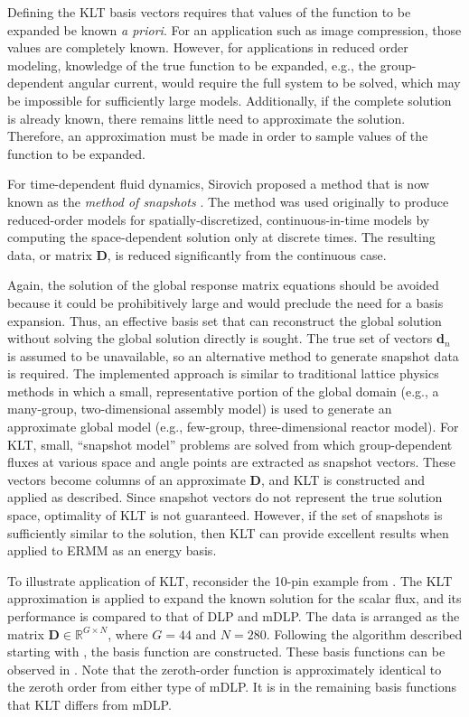 Defining the KLT basis vectors requires that values of the function to be 
expanded be known {\it a priori}.  For an application such as image compression,
those values are completely known.  However, for applications in reduced order 
modeling, knowledge of the true function to be expanded,
e.g., the group-dependent angular current, would require the full system to be 
solved, which may be impossible for sufficiently large models.  Additionally, 
if the complete solution is already known, there remains little need to 
approximate the solution. Therefore, an approximation must be made in order to 
sample values of the function to be expanded.  

For  time-dependent fluid dynamics, Sirovich proposed a method 
\citep{Sirovich1987} that is now known as the {\it method of snapshots} 
\citep{Buchan2013}. The method was used originally to produce reduced-order 
models for spatially-discretized, continuous-in-time models by computing the 
space-dependent solution only at discrete times. The resulting data, or matrix 
$\mathbf{D}$, is reduced significantly from the continuous case.

Again, the solution of the global response matrix equations should 
be avoided because it could be prohibitively large and would preclude the need 
for a basis expansion.  Thus, an effective basis set that can reconstruct 
the global solution without solving the global solution directly is sought.  
The true set of vectors $\mathbf{d}_n$ is assumed to be unavailable, so an 
alternative method to generate snapshot data is required. The implemented
approach is similar to traditional lattice physics methods in which a small, 
representative portion of the global domain (e.g., a many-group, two-dimensional 
assembly model) is used to generate an approximate global model (e.g., 
few-group, three-dimensional reactor model).  For KLT, small, ``snapshot model'' 
problems are solved from which group-dependent fluxes at various space and 
angle points are extracted as snapshot vectors.  These vectors become 
columns of an approximate $\mathbf{D}$, and KLT is constructed and applied as described.  
Since snapshot vectors do not represent the true solution space, optimality of 
KLT is not guaranteed. However, if the set of snapshots is sufficiently similar 
to the solution, then KLT can provide excellent results when applied to ERMM as 
an energy basis.

To illustrate application of KLT, reconsider the 10-pin example from 
.  The KLT approximation is applied 
to expand the known solution for the scalar flux, and its performance 
is compared to that of DLP and mDLP.  The data is arranged as 
the matrix $\mathbf{D} 
\in \mathbb{R}^{G\times N}$, where $G=44$ and $N=280$.  Following the algorithm 
described starting with , the basis function are constructed.  These 
basis functions can be observed in .  Note that the 
zeroth-order function is approximately identical to the zeroth order from 
either type of mDLP.  It is in the remaining basis functions that KLT differs 
from mDLP.

